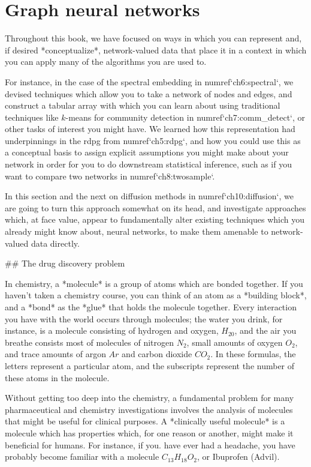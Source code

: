 \section{Graph neural networks}
\label{sec:ch10:gnns}

Throughout this book, we have focused on ways in which you can represent and, if desired *conceptualize*, network-valued data that place it in a context in which you can apply many of the algorithms you are used to. 

For instance, in the case of the spectral embedding in {numref}`ch6:spectral`, we devised techniques which allow you to take a network of nodes and edges, and construct a tabular array with which you can learn about using traditional techniques like $k$-means for community detection in {numref}`ch7:comm_detect`, or other tasks of interest you might have. We learned how this representation had underpinnings in the rdpg from {numref}`ch5:rdpg`, and how you could use this as a conceptual basis to assign explicit assumptions you might make about your network in order for you to do downstream statistical inference, such as if you want to compare two networks in {numref}`ch8:twosample`. 

In this section and the next on diffusion methods in {numref}`ch10:diffusion`, we are going to turn this approach somewhat on its head, and investigate approaches which, at face value, appear to fundamentally alter existing techniques which you already might know about, neural networks, to make them amenable to network-valued data directly.

## The drug discovery problem

In chemistry, a *molecule* is a group of atoms which are bonded together. If you haven't taken a chemistry course, you can think of an atom as a *building block*, and a *bond* as the *glue* that holds the molecule together. Every interaction you have with the world occurs through molecules; the water you drink, for instance, is a molecule consisting of hydrogen and oxygen, $H_20$, and the air you breathe consists most of molecules of nitrogen $N_2$, small amounts of oxygen $O_2$, and trace amounts of argon $Ar$ and carbon dioxide $CO_2$. In these formulas, the letters represent a particular atom, and the subscripts represent the number of these atoms in the molecule.

Without getting too deep into the chemistry, a fundamental problem for many pharmaceutical and chemistry investigations involves the analysis of molecules that might be useful for clinical purposes. A *clinically useful molecule* is a molecule which has properties which, for one reason or another, might make it beneficial for humans. For instance, if you. have ever had a headache, you have probably become familiar with a molecule $C_{13}H_{18}O_2$, or Ibuprofen (Advil).

